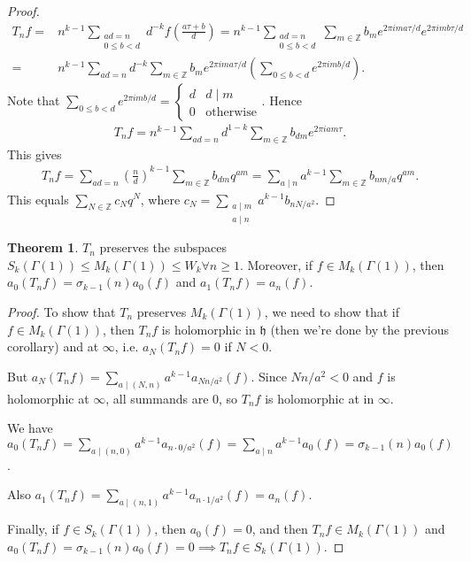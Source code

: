 \documentclass{article}
\theoremstyle{definition}
\newtheorem{theorem}{Theorem}[section]
\begin{document}
\begin{proof}
    \begin{align*}
        T_n f =& n^{k-1} \sum_{\substack{ad = n \\ 0\le b<d}}^{} d^{-k} f\left(\frac{a \tau + b}{d}\right) = n^{k-1} \sum_{\substack{ad = n\\ 0\le b<d}}^{} \sum_{ m \in \mathbb{Z}}^{} b_m e^{2 \pi i m a \tau/d}e^{2\pi i m b \tau/d} \\
        =& n^{k-1}\sum_{ad = n}^{} d^{-k}\sum_{ m \in \mathbb{Z}}^{} b_m e^{2\pi i m a \tau/d} \left(\sum_{0\le b<d}^{} e^{2\pi i m b /d}\right).
    \end{align*}
    Note that $\sum_{0\le b<d}^{} e^{2\pi i m b /d} = \begin{cases}
        d & d \mid m\\
        0 & \text{otherwise}
    \end{cases}$. Hence 
    \begin{align*}
        T_n f = n^{k-1}\sum_{ad=n}^{} d^{1-k}\sum_{m \in \mathbb{Z}}^{} b_{dm}e^{2\pi i a m \tau}.
    \end{align*}
    This gives 
    \begin{align*}
        T_n f = \sum_{ad = n}^{} \left(\frac{n}{d}\right)^{k-1}\sum_{ m \in \mathbb{Z}}^{} b_{dm}q^{am} = \sum_{a \mid n}^{} a^{k-1}\sum_{ m \in \mathbb{Z}}^{} b_{nm/a}q^{am}.
    \end{align*}
    This equals $\sum_{N \in \mathbb{Z}}^{} c_N q^N$, where $c_N = \sum_{\substack{a \mid m \\ a \mid n}}^{} a^{k-1}b_{nN/a^2}$.
\end{proof}
\begin{theorem}
    $T_n$ preserves the subspaces $S_k(\Gamma(1)) \le M_k(\Gamma(1)) \le W_k \forall n\ge 1$. Moreover, if $f \in M_k(\Gamma(1))$, then $a_0(T_n f) = \sigma_{k-1}(n) a_0(f)$ and $a_1(T_n f) = a_n (f)$. 
\end{theorem}
\begin{proof}
    To show that $T_n$ preserves $M_k(\Gamma(1))$, we need to show that if $f \in M_k(\Gamma(1))$, then $T_n f$ is holomorphic in $\mathfrak{h}$ (then we're done by the previous corollary) and at $\infty$, i.e. $a_N(T_n f) = 0$ if $N<0$.
    \vspace{1mm}
     
    But $a_N(T_n f)= \sum_{a \mid (N,n)}^{} a^{k-1}a_{Nn/a^2}(f)$. Since $Nn/a^2<0$ and $f$ is holomorphic at $\infty$, all summands are 0, so $T_n f$ is holomorphic at in $\infty$.
    \vspace{1mm}
     
    We have $a_0(T_n f) = \sum_{a \mid (n,0)}^{} a^{k-1}a_{n\cdot 0/a^2}(f) = \sum_{a \mid n}^{} a^{k-1}a_0(f) = \sigma_{k-1}(n)a_0(f)$.
    \vspace{1mm}
     
    Also $a_1(T_n f) = \sum_{a \mid (n,1)}^{} a^{k-1}a_{n\cdot 1/a^2}(f) = a_n(f)$.
    \vspace{1mm}
     
    Finally, if $f \in S_k(\Gamma(1))$, then $a_0(f) = 0$, and then $T_n f \in M_k(\Gamma(1))$ and $a_0(T_n f) = \sigma_{k-1}(n)a_0(f) = 0 \implies T_n f \in S_k(\Gamma(1))$. 
\end{proof}
\end{document}
